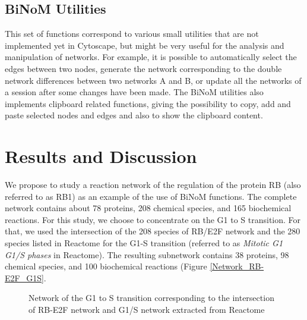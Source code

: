 \documentclass[10pt]{bmc_article}
\def\texttt{[image: ]}
\newenvironment{bmcformat}{\baselineskip20pt\sloppy\setboolean{publ}{false}}{\baselineskip20pt\sloppy}
\begin{document}
\begin{bmcformat}
\subsection*{BiNoM Utilities}
This set of functions correspond to various small utilities that are not
implemented yet in Cytoscape, but might be very useful for the analysis and
manipulation of networks. For example, it is possible to automatically select
the edges between two nodes, generate the network corresponding to the double
network differences between two networks A and B, or update all the networks of
a session after some changes have been made. The BiNoM utilities also implements
clipboard related functions, giving the possibility to copy, add and paste
selected nodes and edges and also to show the clipboard content. 


\section*{Results and Discussion}

We propose to study a reaction network of the regulation of the protein RB (also referred to as RB1) \cite{calzone2008comprehensive} as an example of the use of BiNoM functions. The complete network contains about 78 proteins, 208 chemical species, and 165 biochemical reactions. For this study, we choose to concentrate on the G1 to S transition. For that, we used the intersection of the 208 species of RB/E2F network and the 280 species listed in Reactome for the G1-S transition (referred to as \emph{Mitotic G1 G1/S phases} in Reactome). The resulting subnetwork contains 38 proteins, 98 chemical species, and 100 biochemical reactions (Figure \ref{Network_RB-E2F_G1S}.


\begin{figure}
\caption{Network of the G1 to S transition corresponding to the intersection of RB-E2F network and G1/S network extracted from Reactome}
\label{Network_Rb-E2F_G1S}
\end{figure}


 



\end{bmcformat}
\end{document}
